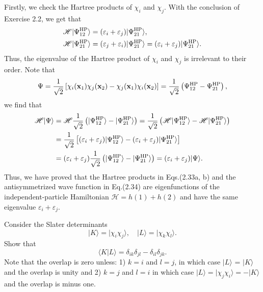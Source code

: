 \documentclass[a4paper]{book}
\newcounter{exercise}[chapter]
\newcounter{solution}[chapter]
\newcommand{\bfx}{{\bf x}}
\newcommand{\HP}{{\rm HP}}
\begin{document}
	\begin{solution}
	Firstly, we check the Hartree products of $\chi_i$ and $\chi_j$. With the conclusion of Exercise 2.2, we get that
	\begin{align*}
		\mathscr{H} | \Psi^\HP_{12} \rangle &= ( \varepsilon_i + \varepsilon_j ) | \Psi^\HP_{21} \rangle, \\
		\mathscr{H} | \Psi^\HP_{21} \rangle &= ( \varepsilon_j + \varepsilon_i ) | \Psi^\HP_{21} \rangle = ( \varepsilon_i + \varepsilon_j ) | \Psi^\HP_{21} \rangle.
	\end{align*}
	Thus, the eigenvalue of the Hartree product of $\chi_i$ and $\chi_j$ is irrelevant to their order. Note that
	\[
		\Psi = \frac{1}{\sqrt{2}} \left[ \chi_i(\bfx_1) \chi_j(\bfx_2) - \chi_j(\bfx_1) \chi_i(\bfx_2) \right] = \frac{1}{\sqrt{2}} \left( \Psi^\HP_{12} - \Psi^\HP_{21} \right),
	\]
	we find that
	\begin{align*}
		\mathscr{H} | \Psi \rangle &= \mathscr{H} \frac{1}{\sqrt{2}} \left( | \Psi^\HP_{12} \rangle - | \Psi^\HP_{21} \rangle \right) = \frac{1}{\sqrt{2}} \left( \mathscr{H} | \Psi^\HP_{12} \rangle - \mathscr{H} | \Psi^\HP_{21} \rangle \right) \\
		&= \frac{1}{\sqrt{2}} \left[ ( \varepsilon_i + \varepsilon_j ) | \Psi^\HP_{12} \rangle - ( \varepsilon_i + \varepsilon_j ) | \Psi^\HP_{21} \rangle \right] \\
		&= ( \varepsilon_i + \varepsilon_j ) \frac{1}{\sqrt{2}} \left( | \Psi^\HP_{12} \rangle - | \Psi^\HP_{21} \rangle \right) = ( \varepsilon_i + \varepsilon_j ) | \Psi \rangle.
	\end{align*}
	Thus, we have proved that the Hartree products in Eqs.(2.33a, b) and the antisymmetrized wave function in Eq.(2.34) are eigenfunctions of the independent-particle Hamiltonian $\mathscr{H} = h(1) + h(2)$ and have the same eigenvalue $\varepsilon_i + \varepsilon_j$. 
	\end{solution}
	
	\begin{exercise}
	Consider the Slater determinants
	\[
		| K \rangle = | \chi_i \chi_j \rangle, \quad | L \rangle = | \chi_k \chi_l \rangle.
	\]
	Show that
	\[
		\langle K | L \rangle = \delta_{ik} \delta_{jl} - \delta_{il} \delta_{jk}.
	\]
	Note that the overlap is zero unless: 1) $k=i$ and $l=j$, in which case $|L\rangle$ = $|K\rangle$ and the overlap is unity and 2) $k=j$ and $l=i$ in which case $|L\rangle= |\chi_j \chi_i \rangle = -|K\rangle$ and the overlap is minus one.
	\end{exercise}
	
\end{document}
